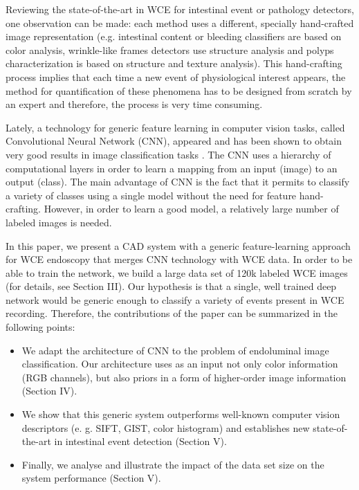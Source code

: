 \documentclass[review,12pt,3p]{elsarticle}
\begin{document}
Reviewing the state-of-the-art in WCE for intestinal event or pathology detectors, one observation can be made: each method uses a different, specially hand-crafted image representation (e.g. intestinal content or bleeding classifiers are based on color analysis, wrinkle-like frames detectors use  structure analysis and polyps characterization is based on structure and texture analysis). This hand-crafting process implies that each time a new event of physiological interest appears, the method for quantification of these phenomena has to be designed from scratch by an expert and therefore, the process is very time consuming.

Lately, a technology for generic feature learning in computer vision tasks, called Convolutional Neural Network (CNN), appeared and has been shown to obtain very good results in image classification tasks \cite{krizhevsky2012imagenet, DBLP:journals/corr/SzegedyLJSRAEVR14, DBLP:journals/corr/SimonyanZ14a}.  The CNN uses a hierarchy of computational layers in order to learn a mapping from an input (image) to an output (class). The main advantage of CNN is the fact that it permits to classify a variety of classes using a single model without the need for feature hand-crafting. However, in order to learn a good model, a relatively large number of labeled images is needed.

In this paper, we present a CAD system with a generic feature-learning approach for WCE endoscopy that merges CNN technology with WCE data. In order to be able to train the network, we build a large data set of 120k labeled WCE images (for details, see Section III). Our hypothesis is that a single, well trained deep network would be generic enough to classify a variety of events present in WCE recording. Therefore, the contributions of the paper can be summarized in the following points:
\begin{itemize}
  \item We adapt the architecture of CNN to the problem of endoluminal image classification. Our architecture uses as an input not only color information (RGB channels), but also priors in a form of higher-order image information (Section IV).
  \item We show that this generic system outperforms well-known computer vision descriptors (e. g. SIFT, GIST, color histogram) and establishes new state-of-the-art in intestinal event detection (Section V).
  \item Finally, we analyse and illustrate the impact of the data set size on the system performance (Section V).
\end{itemize}
\end{document}
